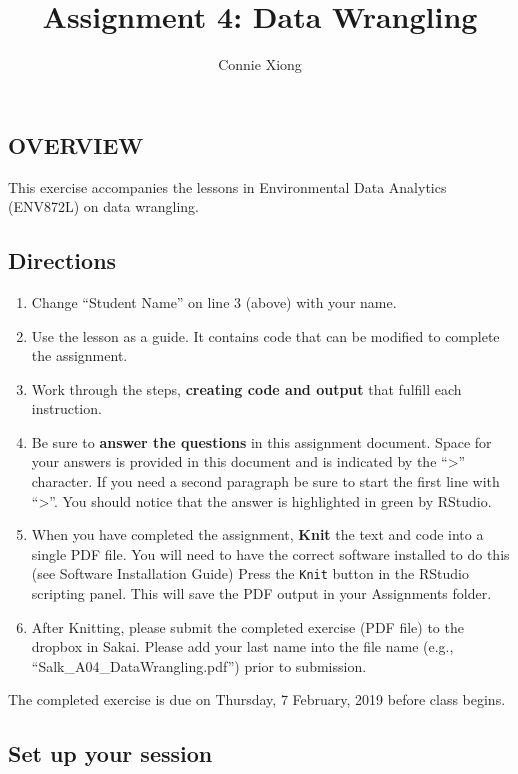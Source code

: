 \documentclass[]{article}
\title{Assignment 4: Data Wrangling}
\author{Connie Xiong}
\date{}
\providecommand{\tightlist}{%
  \setlength{\itemsep}{0pt}\setlength{\parskip}{0pt}}
\begin{document}
\maketitle

\subsection{OVERVIEW}\label{overview}

This exercise accompanies the lessons in Environmental Data Analytics
(ENV872L) on data wrangling.

\subsection{Directions}\label{directions}

\begin{enumerate}
\def\labelenumi{\arabic{enumi}.}
\tightlist
\item
  Change ``Student Name'' on line 3 (above) with your name.
\item
  Use the lesson as a guide. It contains code that can be modified to
  complete the assignment.
\item
  Work through the steps, \textbf{creating code and output} that fulfill
  each instruction.
\item
  Be sure to \textbf{answer the questions} in this assignment document.
  Space for your answers is provided in this document and is indicated
  by the ``\textgreater{}'' character. If you need a second paragraph be
  sure to start the first line with ``\textgreater{}''. You should
  notice that the answer is highlighted in green by RStudio.
\item
  When you have completed the assignment, \textbf{Knit} the text and
  code into a single PDF file. You will need to have the correct
  software installed to do this (see Software Installation Guide) Press
  the \texttt{Knit} button in the RStudio scripting panel. This will
  save the PDF output in your Assignments folder.
\item
  After Knitting, please submit the completed exercise (PDF file) to the
  dropbox in Sakai. Please add your last name into the file name (e.g.,
  ``Salk\_A04\_DataWrangling.pdf'') prior to submission.
\end{enumerate}

The completed exercise is due on Thursday, 7 February, 2019 before class
begins.

\subsection{Set up your session}\label{set-up-your-session}
\end{document}

